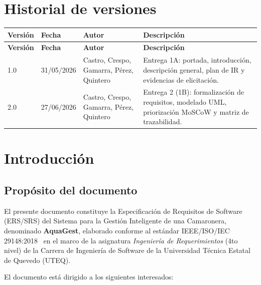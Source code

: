 \documentclass[11pt,a4paper]{article}
\begin{document}
\section*{Historial de versiones}

\begin{longtable}{|p{2cm}|p{2.5cm}|p{4cm}|p{7cm}|}
\hline
\textbf{Versión} & \textbf{Fecha} & \textbf{Autor} & \textbf{Descripción} \\
\hline
\endfirsthead

\hline
\textbf{Versión} & \textbf{Fecha} & \textbf{Autor} & \textbf{Descripción} \\
\hline
\endhead

\hline
\endfoot

\hline
\endlastfoot

1.0 & 31/05/2026 & Castro, Crespo, Gamarra, Pérez, Quintero & Entrega 1A: portada, introducción, descripción general, plan de IR y evidencias de elicitación. \\
\hline

2.0 & 27/06/2026 & Castro, Crespo, Gamarra, Pérez, Quintero & Entrega 2 (1B): formalización de requisitos, modelado UML, priorización MoSCoW y matriz de trazabilidad. \\
\hline

\end{longtable}

\newpage
\tableofcontents
\listoffigures
\listoftables


\section{Introducción}

\subsection{Propósito del documento}
El presente documento constituye la Especificación de Requisitos de Software (ERS/SRS) del Sistema para la Gestión Inteligente de una Camaronera, denominado \textbf{AquaGest}, elaborado conforme al estándar IEEE/ISO/IEC 29148:2018~\cite{ieee29148} en el marco de la asignatura \textit{Ingeniería de Requerimientos} (4to nivel) de la Carrera de Ingeniería de Software de la Universidad Técnica Estatal de Quevedo (UTEQ).

El documento está dirigido a los siguientes interesados:
\end{document}
